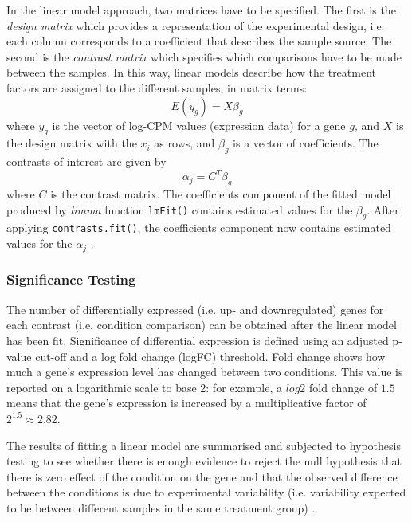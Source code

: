         \newpage
        In the linear model approach,  two matrices have to be specified. The first is the \textit{design matrix} which provides a representation of the experimental design, i.e. each column corresponds to a coefficient that describes the sample source. The second is the \textit{contrast matrix} which specifies which comparisons have to be made between the samples. In this way, linear models describe how the treatment factors are assigned to the different samples, in matrix terms: $$ E(y_g) = X \beta_g$$ where $y_g$ is the vector of log-CPM values (expression data) for a gene $g$, and $X$ is the design matrix with the $x_i $ as rows, and $ \beta_g$ is a vector of coefficients. The contrasts of interest are given by $$\alpha_j = C^T \beta_g$$ where $C$ is the contrast matrix. The coefficients component of the fitted model produced by \textit{limma} function \texttt{lmFit()} contains estimated values for the $\beta_g$. After applying \texttt{contrasts.fit()}, the coefficients component now contains estimated values for the $\alpha_j$ \cite{Smyth2005}.
        
        \subsubsection{Significance Testing}
        
        The number of differentially expressed (i.e. up- and downregulated) genes for each contrast (i.e. condition comparison) can be obtained after the linear model has been fit. Significance of differential expression is defined using an adjusted p-value cut-off and a log fold change (logFC) threshold.
        Fold change shows how much a gene’s expression level has changed between two conditions. This value is reported on a logarithmic scale to base 2: for example, a $log2$ fold change of $1.5$ means that the gene’s expression is increased by a multiplicative factor of $2^{1.5} \approx 2.82$.
        
        The results of fitting a linear model are summarised and subjected to hypothesis testing to see whether there is enough evidence to reject the null hypothesis that there is zero effect of the condition on the gene and that the observed difference between the conditions is due to experimental variability (i.e. variability expected to be between different samples in the same treatment group) \cite{Love2016RNA-SeqApproved}.
        
